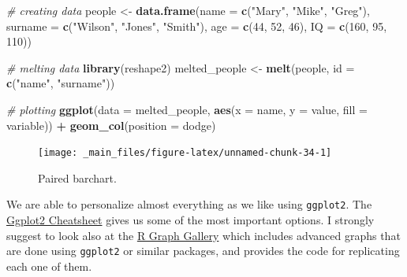 \documentclass[
]{article}
\newenvironment{Shaded}{\begin{snugshade}}{\end{snugshade}}
\newcommand{\AttributeTok}[1]{\textcolor[rgb]{0.13,0.29,0.53}{#1}}
\newcommand{\CommentTok}[1]{\textcolor[rgb]{0.56,0.35,0.01}{\textit{#1}}}
\newcommand{\DecValTok}[1]{\textcolor[rgb]{0.00,0.00,0.81}{#1}}
\newcommand{\FunctionTok}[1]{\textcolor[rgb]{0.13,0.29,0.53}{\textbf{#1}}}
\newcommand{\NormalTok}[1]{#1}
\newcommand{\OtherTok}[1]{\textcolor[rgb]{0.56,0.35,0.01}{#1}}
\newcommand{\SpecialCharTok}[1]{\textcolor[rgb]{0.81,0.36,0.00}{\textbf{#1}}}
\newcommand{\StringTok}[1]{\textcolor[rgb]{0.31,0.60,0.02}{#1}}
\begin{document}
\begin{Shaded}
\begin{Highlighting}[]
\CommentTok{\# creating data}
\NormalTok{people }\OtherTok{\textless{}{-}} \FunctionTok{data.frame}\NormalTok{(}\AttributeTok{name =} \FunctionTok{c}\NormalTok{(}\StringTok{"Mary"}\NormalTok{, }\StringTok{"Mike"}\NormalTok{, }\StringTok{"Greg"}\NormalTok{),}
                     \AttributeTok{surname =} \FunctionTok{c}\NormalTok{(}\StringTok{"Wilson"}\NormalTok{, }\StringTok{"Jones"}\NormalTok{, }\StringTok{"Smith"}\NormalTok{),}
                     \AttributeTok{age =} \FunctionTok{c}\NormalTok{(}\DecValTok{44}\NormalTok{, }\DecValTok{52}\NormalTok{, }\DecValTok{46}\NormalTok{),}
                     \AttributeTok{IQ =} \FunctionTok{c}\NormalTok{(}\DecValTok{160}\NormalTok{, }\DecValTok{95}\NormalTok{, }\DecValTok{110}\NormalTok{))}

\CommentTok{\# melting data}
\FunctionTok{library}\NormalTok{(reshape2)}
\NormalTok{melted\_people }\OtherTok{\textless{}{-}} \FunctionTok{melt}\NormalTok{(people, }\AttributeTok{id =} \FunctionTok{c}\NormalTok{(}\StringTok{"name"}\NormalTok{, }\StringTok{"surname"}\NormalTok{))}

\CommentTok{\# plotting}
\FunctionTok{ggplot}\NormalTok{(}\AttributeTok{data =}\NormalTok{ melted\_people, }\FunctionTok{aes}\NormalTok{(}\AttributeTok{x =}\NormalTok{ name, }\AttributeTok{y =}\NormalTok{ value, }\AttributeTok{fill =}\NormalTok{ variable)) }\SpecialCharTok{+}
  \FunctionTok{geom\_col}\NormalTok{(}\AttributeTok{position =} \StringTok{\textquotesingle{}dodge\textquotesingle{}}\NormalTok{)}
\end{Highlighting}
\end{Shaded}

\begin{figure}[H]

{\centering \texttt{[image: \_main\_files/figure-latex/unnamed-chunk-34-1]} 

}

\caption{Paired barchart.}\label{fig:unnamed-chunk-34}
\end{figure}

We are able to personalize almost everything as we like using \texttt{ggplot2}.
The \href{https://rstudio.com/wp-content/uploads/2015/03/ggplot2-cheatsheet.pdf}{Ggplot2 Cheatsheet} gives us some of the most important options. I strongly suggest to look
also at the \href{https://www.r-graph-gallery.com}{R Graph Gallery} which
includes advanced graphs that are done using \texttt{ggplot2} or similar
packages, and provides the code for replicating each one of them.
\end{document}
